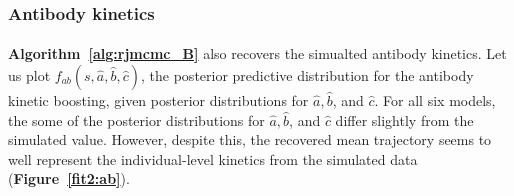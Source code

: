 \subsubsection{Antibody kinetics}
\paragraph{} \textbf{Algorithm~\ref{alg:rjmcmc_B}} also recovers the simualted antibody kinetics. Let us plot $f_{ab}(s, \hat{a}, \hat{b}, \hat{c})$, the posterior predictive distribution for the antibody kinetic boosting, given posterior distributions for $\hat{a}, \hat{b}$, and $\hat{c}$. For all six models, the some of the posterior distributions for $\hat{a}, \hat{b}$, and $\hat{c}$ differ slightly from the simulated value. However, despite this, the recovered mean trajectory seems to well represent the individual-level kinetics from the simulated data (\textbf{Figure~\ref{fit2:ab}}). 

